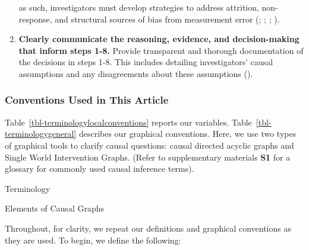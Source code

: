 \documentclass[
  single column]{article}
\begin{document}
\begin{enumerate}
  as such, investigators must develop strategies to address attrition,
  non-response, and structural sources of bias from measurement error
  (;
  ;
  ;
  ).
\item
  \textbf{Clearly communicate the reasoning, evidence, and
  decision-making that inform steps 1-8.} Provide transparent and
  thorough documentation of the decisions in steps 1-8. This includes
  detailing investigators' causal assumptions and any disagreements
  about these assumptions ().
\end{enumerate}

\subsubsection{Conventions Used in This
Article}\label{conventions-used-in-this-article}

Table~\ref{tbl-terminologylocalconventions} reports our variables.
Table~\ref{tbl-terminologygeneral} describes our graphical conventions.
Here, we use two types of graphical tools to clarify causal questions:
causal directed acyclic graphs and Single World Intervention Graphs.
(Refer to supplementary materials \textbf{S1} for a glossary for
commonly used causal inference terms).

\begin{table}

\caption{\label{tbl-terminologylocalconventions}Terminology}

\centering{

\terminologylocalconventions

}

\end{table}%

\begin{table}

\caption{\label{tbl-terminologygeneral}Elements of Causal Graphs}

\centering{

\terminologygeneral

}

\end{table}%

Throughout, for clarity, we repeat our definitions and graphical
conventions as they are used. To begin, we define the following:
\end{document}
